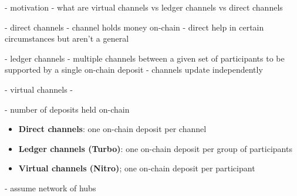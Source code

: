 \documentclass{article}
\begin{document}
- motivation
- what are virtual channels vs ledger channels vs direct channels

- direct channels
- channel holds money on-chain
- direct help in certain circumstances but aren't a general 

- ledger channels
- multiple channels between a given set of participants to be supported by a single on-chain deposit
- channels update independently

- virtual channels
- 

- number of deposits held on-chain
\begin{itemize}
  \item \textbf{Direct channels}: one on-chain deposit per channel
  \item \textbf{Ledger channels (Turbo)}: one on-chain deposit per group of participants
  \item \textbf{Virtual channels (Nitro)}; one on-chain deposit per participant
\end{itemize}

- assume network of hubs
\end{document}
